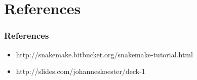 \documentclass{beamer}
\begin{document}
\section{References}

\begin{frame}
    \frametitle{References}
    \begin{itemize}
        \item http://snakemake.bitbucket.org/snakemake-tutorial.html
        \item http://slides.com/johanneskoester/deck-1
    \end{itemize}
\end{frame}
\end{document}
